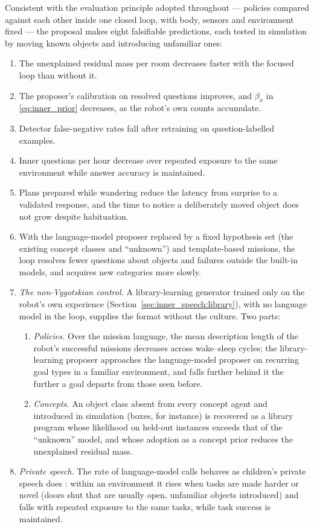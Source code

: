 Consistent with the evaluation principle adopted throughout --- policies compared against each other inside one
closed loop, with body, sensors and environment fixed --- the proposal makes eight falsifiable predictions, each
tested in simulation by moving known objects and introducing unfamiliar ones:
\begin{enumerate}[label=\textbf{P\arabic*}]
    \item The unexplained residual mass per room decreases faster with the focused loop than without it.
    \item The proposer's calibration on resolved questions improves, and $\beta_x$ in \eqref{eq:inner_prior}
    decreases, as the robot's own counts accumulate.
    \item Detector false-negative rates fall after retraining on question-labelled examples.
    \item Inner questions per hour decrease over repeated exposure to the same environment while answer accuracy
    is maintained.
    \item Plans prepared while wandering reduce the latency from surprise to a validated response, and the time to
    notice a deliberately moved object does not grow despite habituation.
    \item With the language-model proposer replaced by a fixed hypothesis set (the existing concept classes and
    ``unknown'') and template-based missions, the loop resolves fewer questions about objects and failures outside
    the built-in models, and acquires new categories more slowly.
    \item \emph{The non-Vygotskian control.} A library-learning generator trained only on the robot's own experience
    (Section~\ref{sec:inner_speech:library}), with no language model in the loop, supplies the format without the
    culture. Two parts:
    \begin{enumerate}[label=(\alph*)]
        \item \emph{Policies.} Over the mission language, the mean description length of the robot's successful
        missions decreases across wake--sleep cycles; the library-learning proposer approaches the language-model
        proposer on recurring goal types in a familiar environment, and falls further behind it the further a goal
        departs from those seen before.
        \item \emph{Concepts.} An object class absent from every concept agent and introduced in simulation (boxes,
        for instance) is recovered as a library program whose likelihood on held-out instances exceeds that of the
        ``unknown'' model, and whose adoption as a concept prior reduces the unexplained residual mass.
    \end{enumerate}
    \item \emph{Private speech.} The rate of language-model calls behaves as children's private speech does
    \cite{berk1992children}: within an environment it rises when tasks are made harder or novel (doors shut that are
    usually open, unfamiliar objects introduced) and falls with repeated exposure to the same tasks, while task
    success is maintained.
\end{enumerate}
